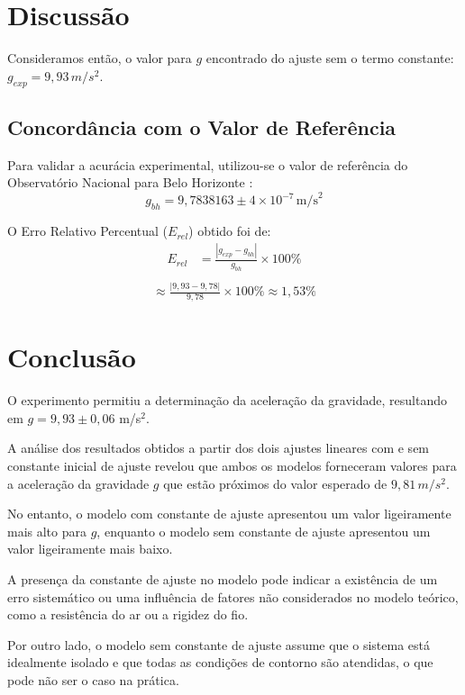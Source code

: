 \documentclass[12pt,a4paper]{article}
\begin{document}
\section{Discussão}

Consideramos então, o valor para $g$ encontrado do ajuste sem o termo constante: $g_{exp} = 9,93 \, m/s^2$.

\subsection{Concordância com o Valor de Referência}
Para validar a acurácia experimental, utilizou-se o valor de referência do Observatório Nacional para Belo Horizonte \citep{on_gravimetria_bh_1981}:
\begin{equation}
    g_{bh} = 9{,}7838163 \pm 4\times10^{-7}\,\text{m/s}^2
\end{equation}

O Erro Relativo Percentual ($E_{rel}$) obtido foi de:
\begin{align*}
    E_{rel} &= \frac{|g_{exp} - g_{bh}|}{g_{bh}} \times 100\% \\
\end{align*}
\begin{align*}
\approx \frac{|9,93 - 9,78|}{9,78} \times 100\% \approx 1,53\%
\end{align*}
\section{Conclusão}

O experimento permitiu a determinação da aceleração da gravidade, resultando em $g = 9{,}93 \pm 0{,}06$ m/s$^2$.

A análise dos resultados obtidos a partir dos dois ajustes lineares com e sem constante inicial de ajuste revelou que ambos os modelos forneceram valores para a aceleração da gravidade $g$ que estão próximos do valor esperado de $9,81 \, m/s^2$.

No entanto, o modelo com constante de ajuste apresentou um valor ligeiramente mais alto para $g$, enquanto o modelo sem constante de ajuste apresentou um valor ligeiramente mais baixo. 

A presença da constante de ajuste no modelo pode indicar a existência de um erro sistemático ou uma influência de fatores não considerados no modelo teórico, como a resistência do ar ou a rigidez do fio. 

Por outro lado, o modelo sem constante de ajuste assume que o sistema está idealmente isolado e que todas as condições de contorno são atendidas, o que pode não ser o caso na prática. 



\end{document}
